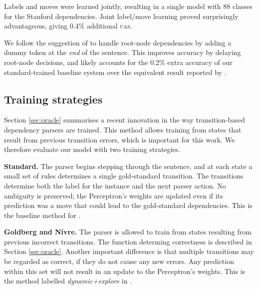 \documentclass[11pt,letterpaper]{article}
\newcommand{\uas}{\textsc{uas}\xspace}
\begin{document}
Labels and moves were learned jointly, resulting in a single model with 88 classes
for the Stanford dependencies. Joint label/move learning proved surprisingly
advantageous, giving 0.4\% additional \uas.

We follow the suggestion of \citet{nivre:squib} to handle root-node dependencies by
adding a dummy token at the \emph{end} of the sentence.
This improves accuracy by delaying root-node decisions, and likely accounts for the
0.2\% extra accuracy of our standard-trained baseline system over the equivalent result
reported by \citet{goldberg:12}.

\subsection{Training strategies}

Section \ref{sec:oracle} summarises a recent innovation in the way transition-based
dependency parsers are trained. This method allows training from states that
result from previous transition errors, which is
important for this work. We therefore evaluate our model with two training strategies.

\textbf{Standard.} 
The parser begins stepping through the sentence, and at each state a small
set of rules determines a single gold-standard transition. The transitions
determine both the label for the instance and the next parser action. No ambiguity
is preserved; the Perceptron's weights are updated even if its prediction was a move
that could lead to the gold-standard dependencies.
This is the baseline method for \citet{goldberg:12}.

\textbf{Goldberg and Nivre.} The parser is allowed to train from states
resulting from previous incorrect transitions. The function determing correctness
is described in Section \ref{sec:oracle}. Another important difference is that
multiple transitions may be regarded as correct, if they do not cause any new
errors. Any prediction within this set will not result in an update to the
Perceptron's weights. This is the method labelled \emph{dynamic+explore}
in \citet{goldberg:12}.
\end{document}
